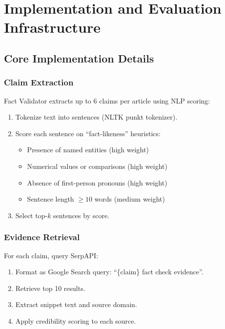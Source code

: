 \documentclass[12pt,a4paper,twoside]{article}
\begin{document}
\section{Implementation and Evaluation Infrastructure}

\subsection{Core Implementation Details}

\subsubsection{Claim Extraction}

Fact Validator extracts up to 6 claims per article using NLP scoring:

\begin{enumerate}
    \item Tokenize text into sentences (NLTK punkt tokenizer).
    \item Score each sentence on ``fact-likeness'' heuristics:
    \begin{itemize}
        \item Presence of named entities (high weight)
        \item Numerical values or comparisons (high weight)
        \item Absence of first-person pronouns (high weight)
        \item Sentence length $\geq 10$ words (medium weight)
    \end{itemize}
    \item Select top-$k$ sentences by score.
\end{enumerate}

\subsubsection{Evidence Retrieval}

For each claim, query SerpAPI:

\begin{enumerate}
    \item Format as Google Search query: ``\{claim\} fact check evidence''.
    \item Retrieve top 10 results.
    \item Extract snippet text and source domain.
    \item Apply credibility scoring to each source.
\end{enumerate}
\end{document}

